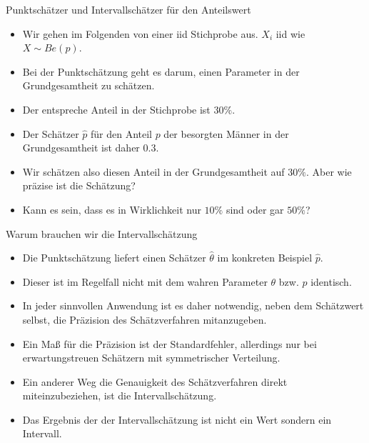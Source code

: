 \documentclass[usenames,dvipsnames,handout]{beamer}
\begin{document}
\begin{frame}{Punktschätzer und Intervallschätzer für den Anteilswert}
\begin{itemize}
\item{Wir gehen im Folgenden von einer iid Stichprobe aus. $X_{i}$ iid wie $X \sim Be(p).$}\pause
\item{Bei der Punktschätzung geht es darum, einen Parameter in der Grundgesamtheit
zu schätzen. }\pause
\item{Der entspreche Anteil in der Stichprobe ist $30\%.$}\pause
\item{Der Schätzer $\hat{p}$
für den Anteil $p$ der besorgten Männer in der Grundgesamtheit ist daher $0.3.$}\pause
\item{Wir schätzen also diesen Anteil in der  Grundgesamtheit auf $30\%.$ Aber wie präzise ist die Schätzung?}\pause
\item{Kann es sein, dass es in Wirklichkeit nur $10\%$ sind oder gar $50\%$?}
\end{itemize}
\end{frame}
\begin{frame}{Warum brauchen wir die Intervallschätzung}%
\begin{itemize}
\item{Die Punktschätzung liefert einen Schätzer $\hat{\theta}$ im konkreten Beispiel $\hat{p}.$}
\item{Dieser ist im Regelfall nicht mit dem wahren Parameter $\theta$ bzw. $p$ identisch.}\pause
\item{In jeder sinnvollen Anwendung ist es daher notwendig, neben dem Schätzwert selbst, die Präzision
des Schätzverfahren mitanzugeben.}\pause
\item{Ein Maß für die Präzision ist der Standardfehler, allerdings nur bei erwartungstreuen Schätzern
mit symmetrischer Verteilung. }\pause
\item{Ein anderer Weg die Genauigkeit des Schätzverfahren direkt miteinzubeziehen, ist die 
Intervallschätzung.}\pause
\item{Das Ergebnis der der Intervallschätzung ist nicht ein Wert sondern ein Intervall.}\pause
\end{itemize}
\end{frame}
\end{document}
